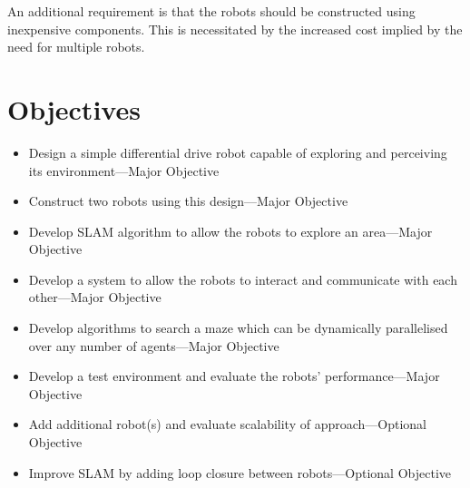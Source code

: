 An additional requirement is that the robots should be constructed using
inexpensive components. This is necessitated by the increased cost implied by the
need for multiple robots.

\section{Objectives}\label{introduction/objectives}
\begin{itemize}
\item{Design a simple differential drive robot capable of exploring and perceiving its environment---Major Objective}
    \item{Construct two robots using this design---Major Objective}
    \item{Develop SLAM algorithm to allow the robots to explore an area---Major Objective}
    \item{Develop a system to allow the robots to interact and communicate with each other---Major Objective}
    \item{Develop algorithms to search a maze which can be dynamically parallelised over any number of agents---Major Objective}
    \item{Develop a test environment and evaluate the robots’ performance---Major Objective}
    \item{Add additional robot(s) and evaluate scalability of approach---Optional Objective}
    \item{Improve SLAM by adding loop closure between robots---Optional Objective}
\end{itemize}